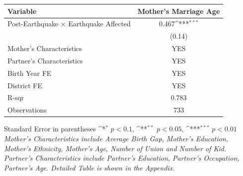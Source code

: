 \def\sym#1{\ifmmode^{#1}\else\(^{#1}\)\fi}
\renewcommand{\arraystretch}{1.4}
\small
\setlength{\tabcolsep}{12pt}
\begin{flushleft}
\begin{tabular}{@{}p{11cm}*{1}{c}@{}}
\hline\hline
Variable & Mother's Marriage Age \\
\hline
Post-Earthquake × Earthquake Affected & 0.467\sym{***} \\
                                      & (0.14) \\
\hline
Mother's Characteristics              & YES \\
Partner's Characteristics             & YES \\
\hline
Birth Year FE                         & YES \\
District FE                           & YES \\
R-sqr                                 & 0.783 \\
Observations                          & 733 \\
\hline\hline
\end{tabular}
\vspace{4pt}
\noindent\footnotesize
Standard Error in parentheses \sym{*} \(p<0.1\), \sym{**} \(p<0.05\), \sym{***} \(p<0.01\)\\
\textit{Mother's Characteristics include Average Birth Gap, Mother's Education, Mother's Ethnicity, Mother's Age, Number of Union and Number of Kid. Partner's Characteristics include Partner's Education, Partner's Occupation, Partner's Age. Detailed Table is shown in the Appendix.}
\end{flushleft}